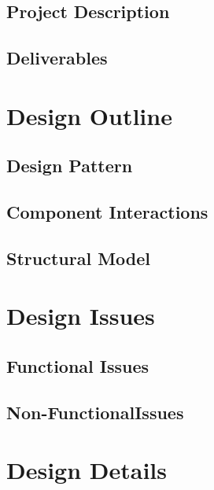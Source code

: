 \documentclass[12pt]{article}
\begin{document}
\subsection{Project Description}


\subsection{Deliverables}




\section{Design Outline}

\subsection{Design Pattern}


\subsection{Component Interactions}


\subsection{Structural Model}




\section{Design Issues}

\subsection{Functional Issues}


\subsection{Non-FunctionalIssues}




\section{Design Details}
\end{document}

